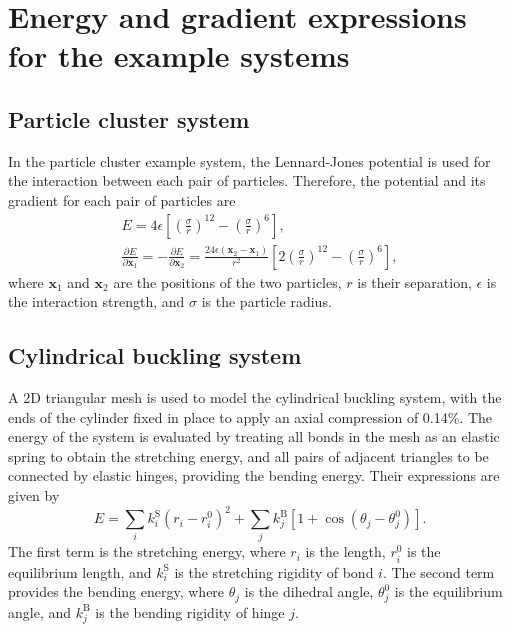 \documentclass[aip,jcp,11pt]{revtex4-2}
\begin{document}
\section{Energy and gradient expressions for the example systems}
\subsection{Particle cluster system}
In the particle cluster example system, the Lennard-Jones potential is used for the interaction between each pair of particles.
Therefore, the potential and its gradient for each pair of particles are
\begin{gather}
  E = 4\epsilon \left[ \left(\frac{\sigma}{r}\right)^{12} - \left(\frac{\sigma}{r}\right)^6 \right], \\
  \frac{\partial E}{\partial \bm{x}_1} = -\frac{\partial E}{\partial \bm{x}_2} =
    \frac{24 \epsilon (\bm{x}_2 - \bm{x}_1)}{r^2} \left[ 2 \left(\frac{\sigma}{r}\right)^{12} - \left(\frac{\sigma}{r}\right)^6 \right],
\end{gather}
where $\bm{x}_1$ and $\bm{x}_2$ are the positions of the two particles, $r$ is their separation, $\epsilon$ is the interaction strength, and $\sigma$ is the particle radius.

\subsection{Cylindrical buckling system}
A 2D triangular mesh is used to model the cylindrical buckling system, with the ends of the cylinder fixed in place to apply an axial compression of 0.14\%.
The energy of the system is evaluated by treating all bonds in the mesh as an elastic spring to obtain the stretching energy, and all pairs of adjacent triangles to be connected by elastic hinges, providing the bending energy.
Their expressions are given by
\begin{equation}
  E = \sum_i k^\mathrm{S}_i (r_i - r^0_i)^2 + \sum_j k^\mathrm{B}_j [1 + \cos(\theta_j - \theta^0_j)].
\end{equation}
The first term is the stretching energy, where $r_i$ is the length, $r^0_i$ is the equilibrium length, and $k^\mathrm{S}_i$ is the stretching rigidity of bond $i$.
The second term provides the bending energy, where $\theta_j$ is the dihedral angle, $\theta^0_j$ is the equilibrium angle, and $k^\mathrm{B}_j$ is the bending rigidity of hinge $j$.
\end{document}
